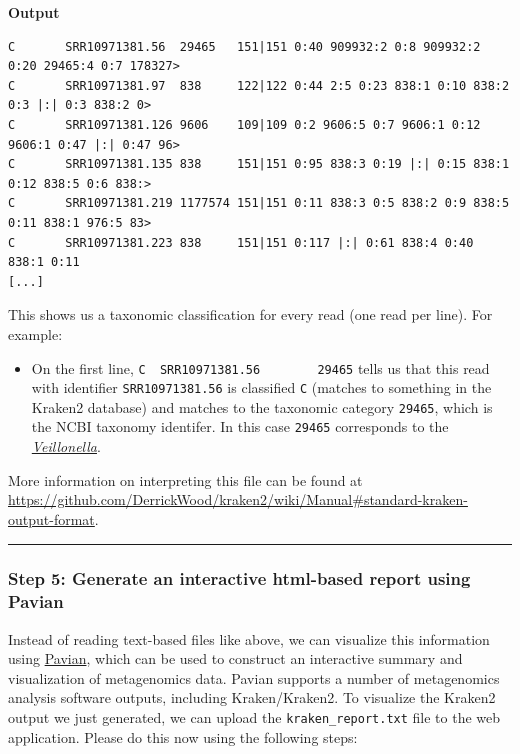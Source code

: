 \documentclass[
]{book}
\providecommand{\tightlist}{%
  \setlength{\itemsep}{0pt}\setlength{\parskip}{0pt}}
\begin{document}
\textbf{Output}

\begin{verbatim}
C       SRR10971381.56  29465   151|151 0:40 909932:2 0:8 909932:2 0:20 29465:4 0:7 178327>
C       SRR10971381.97  838     122|122 0:44 2:5 0:23 838:1 0:10 838:2 0:3 |:| 0:3 838:2 0>
C       SRR10971381.126 9606    109|109 0:2 9606:5 0:7 9606:1 0:12 9606:1 0:47 |:| 0:47 96>
C       SRR10971381.135 838     151|151 0:95 838:3 0:19 |:| 0:15 838:1 0:12 838:5 0:6 838:>
C       SRR10971381.219 1177574 151|151 0:11 838:3 0:5 838:2 0:9 838:5 0:11 838:1 976:5 83>
C       SRR10971381.223 838     151|151 0:117 |:| 0:61 838:4 0:40 838:1 0:11
[...]
\end{verbatim}

This shows us a taxonomic classification for every read (one read per line). For example:

\begin{itemize}
\tightlist
\item
  On the first line, \texttt{C\ \ SRR10971381.56\ \ \ \ \ \ \ \ 29465} tells us that this read with identifier \texttt{SRR10971381.56} is classified \texttt{C} (matches to something in the Kraken2 database) and matches to the taxonomic category \texttt{29465}, which is the NCBI taxonomy identifer. In this case \texttt{29465} corresponds to the \href{https://www.ncbi.nlm.nih.gov/Taxonomy/Browser/wwwtax.cgi?mode=Info&id=29465&lvl=3&lin=f&keep=1&srchmode=1&unlock}{\emph{Veillonella}}.
\end{itemize}

More information on interpreting this file can be found at \url{https://github.com/DerrickWood/kraken2/wiki/Manual\#standard-kraken-output-format}.

\begin{center}\rule{0.5\linewidth}{0.5pt}\end{center}

\subsubsection{Step 5: Generate an interactive html-based report using Pavian}\label{exercise-pavian}

Instead of reading text-based files like above, we can visualize this information using \href{https://fbreitwieser.shinyapps.io/pavian/}{Pavian}, which can be used to construct an interactive summary and visualization of metagenomics data. Pavian supports a number of metagenomics analysis software outputs, including Kraken/Kraken2. To visualize the Kraken2 output we just generated, we can upload the \texttt{kraken\_report.txt} file to the web application. Please do this now using the following steps:
\end{document}
